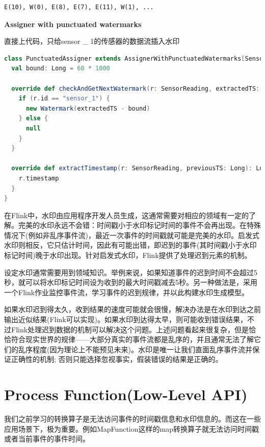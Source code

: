\documentclass[oneside]{ctexbook}
\begin{document}
\begin{lstlisting}
E(10), W(0), E(8), E(7), E(11), W(1), ...
\end{lstlisting}

\textbf{Assigner with punctuated watermarks}

直接上代码，只给sensor \_ 1的传感器的数据流插入水印

\begin{lstlisting}[language=scala]
class PunctuatedAssigner extends AssignerWithPunctuatedWatermarks[SensorReading] {
  val bound: Long = 60 * 1000

  override def checkAndGetNextWatermark(r: SensorReading, extractedTS: Long): Watermark = {
    if (r.id == "sensor_1") {
      new Watermark(extractedTS - bound)
    } else {
      null
    }
  }

  override def extractTimestamp(r: SensorReading, previousTS: Long): Long = {
    r.timestamp
  }
}
\end{lstlisting}

在Flink中，水印由应用程序开发人员生成，这通常需要对相应的领域有一定的了解。完美的水印永远不会错：时间戳小于水印标记时间的事件不会再出现。在特殊情况下(例如非乱序事件流)，最近一次事件的时间戳就可能是完美的水印。启发式水印则相反，它只估计时间，因此有可能出错，即迟到的事件(其时间戳小于水印标记时间)晚于水印出现。针对启发式水印，Flink提供了处理迟到元素的机制。

设定水印通常需要用到领域知识。举例来说，如果知道事件的迟到时间不会超过5秒，就可以将水印标记时间设为收到的最大时间戳减去5秒。另一种做法是，采用一个Flink作业监控事件流，学习事件的迟到规律，并以此构建水印生成模型。

如果水印迟到得太久，收到结果的速度可能就会很慢，解决办法是在水印到达之前输出近似结果(Flink可以实现)。如果水印到达得太早，则可能收到错误结果，不过Flink处理迟到数据的机制可以解决这个问题。上述问题看起来很复杂，但是恰恰符合现实世界的规律——大部分真实的事件流都是乱序的，并且通常无法了解它们的乱序程度(因为理论上不能预见未来)。水印是唯一让我们直面乱序事件流并保证正确性的机制; 否则只能选择忽视事实，假装错误的结果是正确的。

\section{Process Function(Low-Level API)}

我们之前学习的转换算子是无法访问事件的时间戳信息和水印信息的。而这在一些应用场景下，极为重要。例如MapFunction这样的map转换算子就无法访问时间戳或者当前事件的事件时间。
\end{document}
